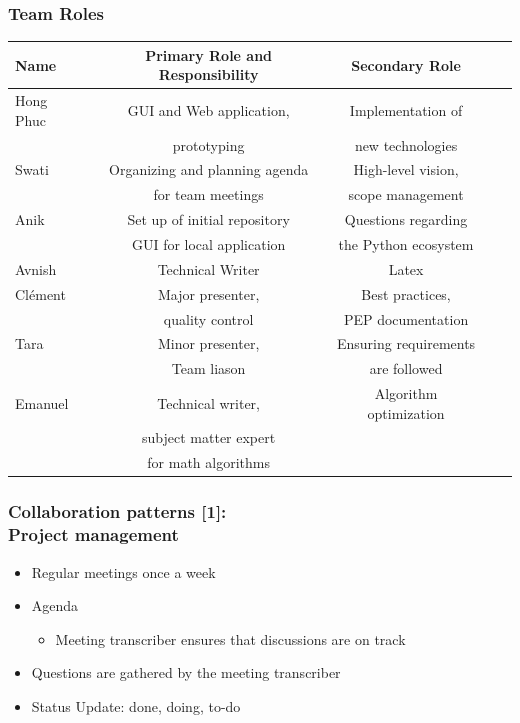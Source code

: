 \documentclass{beamer}
\begin{document}
  \begin{frame}
\frametitle{Team Roles}
\small
\begin{table}
\begin{tabular}{l | c | c | c | c }
Name & Primary Role and Responsibility & Secondary Role \\
\hline
Hong Phuc & GUI and Web application,& Implementation of\\
& prototyping & new technologies\\
\hline
Swati & Organizing and planning agenda& High-level vision, \\
& for team meetings & scope management\\
\hline
Anik & Set up of initial repository& Questions regarding\\
& GUI for local application & the Python ecosystem\\
\hline
Avnish & Technical Writer & Latex \\
\hline
Clément & Major presenter, & Best practices, \\
& quality control  & PEP documentation\\
\hline
Tara & Minor presenter, & Ensuring requirements \\
& Team liason  & are followed\\
\hline
Emanuel & Technical writer, &  Algorithm optimization\\
& subject matter expert  & \\
& for math algorithms  & \\
\end{tabular}
\end{table}
\end{frame}




\begin{frame}
\frametitle{Collaboration patterns [1]:\\ Project management}
\begin{itemize}
 \item Regular meetings once a week
 \item Agenda
   \begin{itemize}
   \item Meeting transcriber ensures that discussions are on track
   \end{itemize}
   \item Questions are gathered by the meeting transcriber
   \item Status Update: done, doing, to-do
\end{itemize}
\end{frame}
\end{document}
